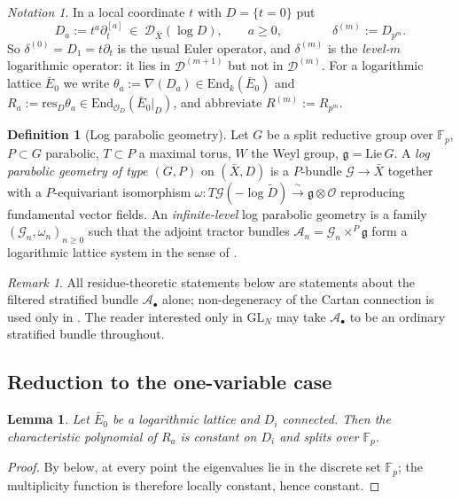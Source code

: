 \documentclass[11pt,reqno]{amsart}
\newcommand{\Fp}{\mathbb{F}_p}
\newcommand{\cO}{\mathcal{O}}
\newcommand{\cD}{\mathcal{D}}
\newcommand{\cG}{\mathcal{G}}
\newcommand{\cA}{\mathcal{A}}
\newcommand{\fg}{\mathfrak{g}}
\newcommand{\End}{\mathrm{End}}
\newcommand{\res}{\mathrm{res}}
\newcommand{\isoto}{\xrightarrow{\ \sim\ }}
\theoremstyle{plain}
\newtheorem{lemma}[theorem]{Lemma}
\theoremstyle{definition}
\newtheorem{definition}[theorem]{Definition}
\theoremstyle{remark}
\newtheorem{remark}[theorem]{Remark}
\newtheorem{notation}[theorem]{Notation}
\numberwithin{equation}{section}
\begin{document}
\begin{notation}\label{not:Da}
In a local coordinate $t$ with $D=\{t=0\}$ put
\[
   D_a:=t^a\partial_t^{[a]}\ \in\ \cD_{\bar X}(\log D),\qquad a\ge0,
   \qquad\qquad \delta^{(m)}:=D_{p^m}.
\]
So $\delta^{(0)}=D_1=t\partial_t$ is the usual Euler operator, and
$\delta^{(m)}$ is the \emph{level-$m$} logarithmic operator: it lies in
$\cD^{(m+1)}$ but not in $\cD^{(m)}$.
For a logarithmic lattice $\bar E_0$ we write
$\theta_a:=\nabla(D_a)\in\End_k(\bar E_0)$ and
$R_a:=\res_D\theta_a\in\End_{\cO_D}(\bar E_0|_D)$, and abbreviate
$R^{(m)}:=R_{p^m}$.
\end{notation}

\begin{definition}[Log parabolic geometry]\label{def:logpar}
Let $G$ be a split reductive group over $\Fp$, $P\subset G$ parabolic,
$T\subset P$ a maximal torus, $W$ the Weyl group, $\fg=\mathrm{Lie}\,G$.
A \emph{log parabolic geometry of type $(G,P)$} on $(\bar X,D)$ is a
$P$-bundle $\cG\to\bar X$ together with a $P$-equivariant isomorphism
$\omega\colon T\cG(-\log\tilde D)\isoto\fg\otimes\cO$ reproducing
fundamental vector fields.  An \emph{infinite-level} log parabolic
geometry is a family $(\cG_n,\omega_n)_{n\ge0}$ such that the adjoint
tractor bundles $\cA_n=\cG_n\times^P\fg$ form a logarithmic lattice system
in the sense of .
\end{definition}

\begin{remark}
All residue-theoretic statements below are statements about the filtered
stratified bundle $\cA_\bullet$ alone; non-degeneracy of the Cartan
connection is used only in .  The
reader interested only in $\mathrm{GL}_N$ may take $\cA_\bullet$ to be an
ordinary stratified bundle throughout.
\end{remark}

\subsection{Reduction to the one-variable case}
\begin{lemma}\label{lem:constant}
Let $\bar E_0$ be a logarithmic lattice and $D_i$ connected.  Then the
characteristic polynomial of $R_a$ is constant on $D_i$ and splits over
$\Fp$.
\end{lemma}
\begin{proof}
By  below, at every point the eigenvalues lie in the
discrete set $\Fp$; the multiplicity function is therefore locally
constant, hence constant.
\end{proof}
\end{document}
